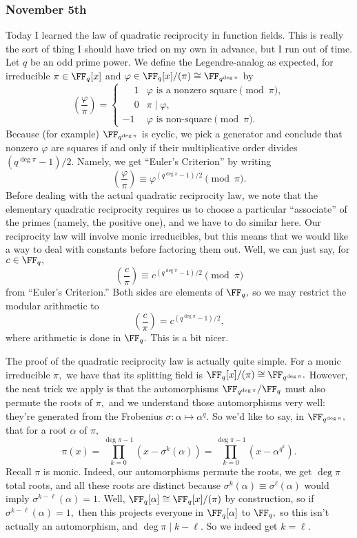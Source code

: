 \subsubsection{November 5th}
Today I learned the law of quadratic reciprocity in function fields. This is really the sort of thing I should have tried on my own in advance, but I run out of time. Let $q$ be an odd prime power. We define the Legendre-analog as expected, for irreducible $\pi\in\FF_q[x]$ and $\varphi\in\FF_q[x]/(\pi)\cong\FF_{q^{\deg\pi}}$ by
\[\left(\frac\varphi\pi\right)=\begin{cases}
    \phantom-1 & \varphi\text{ is a nonzero square}\pmod\pi, \\
    \phantom-0 & \pi\mid\varphi, \\
    -1 & \varphi\text{ is non-square}\pmod\pi.
\end{cases}\]
Because (for example) $\FF_{q^{\deg\pi}}$ is cyclic, we pick a generator and conclude that nonzero $\varphi$ are squares if and only if their multiplicative order divides $\left(q^{\deg\pi}-1\right)/2.$ Namely, we get ``Euler's Criterion'' by writing
\[\left(\frac\varphi\pi\right)\equiv\varphi^{\left(q^{\deg\pi}-1\right)/2}\pmod\pi.\]
Before dealing with the actual quadratic reciprocity law, we note that the elementary quadratic reciprocity requires us to choose a particular ``associate'' of the primes (namely, the positive one), and we have to do similar here. Our reciprocity law will involve monic irreducibles, but this means that we would like a way to deal with constants before factoring them out. Well, we can just say, for $c\in\FF_q,$
\[\left(\frac c\pi\right)\equiv c^{\left(q^{\deg\pi}-1\right)/2}\pmod\pi\]
from ``Euler's Criterion.'' Both sides are elements of $\FF_q,$ so we may restrict the modular arithmetic to
\[\left(\frac c\pi\right)=c^{\left(q^{\deg\pi}-1\right)/2},\]
where arithmetic is done in $\FF_q.$ This is a bit nicer.

The proof of the quadratic reciprocity law is actually quite simple. For a monic irreducible $\pi,$ we have that its splitting field is $\FF_q[x]/(\pi)\cong\FF_{q^{\deg\pi}}.$ However, the neat trick we apply is that the automorphisms $\FF_{q^{\deg\pi}}/\FF_q$ must also permute the roots of $\pi,$ and we understand those automorphisms very well: they're generated from the Frobenius $\sigma:\alpha\mapsto\alpha^q.$ So we'd like to say, in $\FF_{q^{\deg\pi}},$ that for a root $\alpha$ of $\pi,$
\[\pi(x)=\prod_{k=0}^{\deg\pi-1}\left(x-\sigma^k(\alpha)\right)=\prod_{k=0}^{\deg\pi-1}\left(x-\alpha^{q^k}\right).\]
Recall $\pi$ is monic. Indeed, our automorphisms permute the roots, we get $\deg\pi$ total roots, and all these roots are distinct because $\sigma^k(\alpha)\equiv\sigma^\ell(\alpha)$ would imply $\sigma^{k-\ell}(\alpha)=1.$ Well, $\FF_q[\alpha]\cong\FF_q[x]/(\pi)$ by construction, so if $\sigma^{k-\ell}(\alpha)=1,$ then this projects everyone in $\FF_q[\alpha]$ to $\FF_q,$ so this isn't actually an automorphism, and $\deg\pi\mid k-\ell.$ So we indeed get $k=\ell.$

